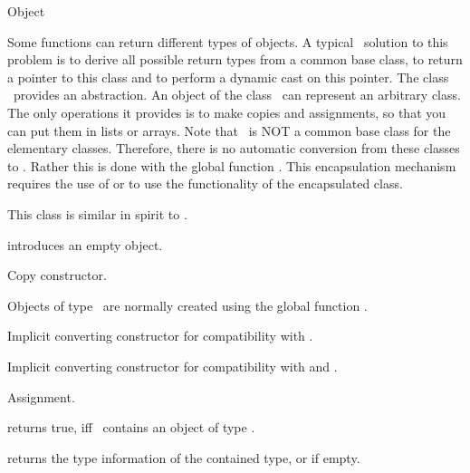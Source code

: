 \begin{ccRefClass}{Object}


\ccDefinition  
Some functions can return different types of objects. A typical
\CC\ solution to this problem is to derive all possible return
types from a common base class, to return a pointer to this 
class and to perform a dynamic cast on this pointer. The class
\ccRefName\ provides an abstraction.
An object  of the class \ccRefName\ can
represent an arbitrary class. The only operations it provides is
to make copies and assignments, so that you can put them in lists
or arrays. Note that \ccRefName\ is NOT a common base class for the
elementary classes. Therefore, there is no 
automatic conversion from these classes to \ccRefName. Rather 
this is done with the global function . This 
encapsulation mechanism requires the use of  or
 to use the functionality of the encapsulated class.

This class is similar in spirit to .

\ccCreation
{}

            {introduces an empty object.}

            {Copy constructor.}

Objects of type \ccRefName\ are normally created using the global function
.

              {Implicit converting constructor for compatibility with
                .}

              {Implicit converting constructor for compatibility with
                 and
                .}

\ccOperations

            {Assignment.}


{returns true, iff \ccVar\ contains an object of type .}

         {returns the type information of the contained type,
          or  if empty.}


\end{ccRefClass}
